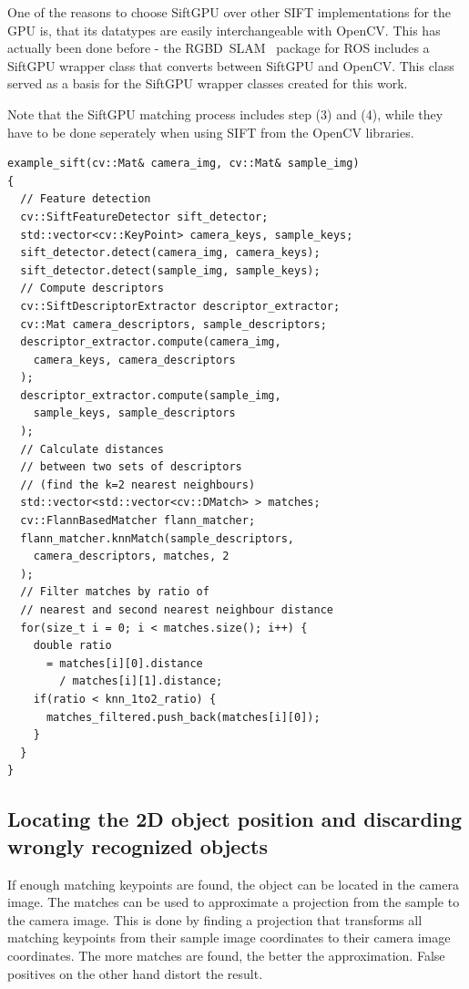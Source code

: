 One of the reasons to choose SiftGPU over other SIFT implementations for the GPU is, that its datatypes are easily interchangeable with OpenCV. This has actually been done before - the RGBD~SLAM~\cite{endres10rgbdslam} package for ROS includes a SiftGPU wrapper class that converts between SiftGPU and OpenCV. This class served as a basis for the SiftGPU wrapper classes created for this work.

Note that the SiftGPU matching process includes step (3) and (4), while they have to be done seperately when using SIFT from the OpenCV libraries.

\begin{lstlisting}[caption=Example of calculating matching points between two images with the OpenCV SIFT implementation.]
example_sift(cv::Mat& camera_img, cv::Mat& sample_img)
{
  // Feature detection
  cv::SiftFeatureDetector sift_detector;
  std::vector<cv::KeyPoint> camera_keys, sample_keys;
  sift_detector.detect(camera_img, camera_keys);
  sift_detector.detect(sample_img, sample_keys);
  // Compute descriptors
  cv::SiftDescriptorExtractor descriptor_extractor;
  cv::Mat camera_descriptors, sample_descriptors;
  descriptor_extractor.compute(camera_img,
    camera_keys, camera_descriptors
  );
  descriptor_extractor.compute(sample_img,
    sample_keys, sample_descriptors
  );
  // Calculate distances
  // between two sets of descriptors
  // (find the k=2 nearest neighbours)
  std::vector<std::vector<cv::DMatch> > matches;
  cv::FlannBasedMatcher flann_matcher;
  flann_matcher.knnMatch(sample_descriptors,
    camera_descriptors, matches, 2
  );
  // Filter matches by ratio of
  // nearest and second nearest neighbour distance
  for(size_t i = 0; i < matches.size(); i++) {
    double ratio
      = matches[i][0].distance
        / matches[i][1].distance;
    if(ratio < knn_1to2_ratio) {
      matches_filtered.push_back(matches[i][0]);
    }
  }
}
\end{lstlisting}

\subsection{Locating the 2D object position and discarding wrongly recognized objects}
\label{sec:impl-2Dpose}
If enough matching keypoints are found, the object can be located in the camera image. The matches can be used to approximate a projection from the sample to the camera image. This is done by finding a projection that transforms all matching keypoints from their sample image coordinates to their camera image coordinates. The more matches are found, the better the approximation. False positives on the other hand distort the result.

